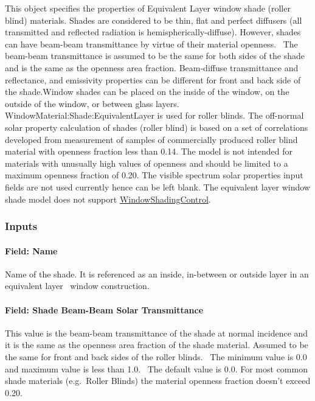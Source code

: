 This object specifies the properties of Equivalent Layer window shade (roller blind) materials. Shades are considered to be thin, flat and perfect diffusers (all transmitted and reflected radiation is hemispherically-diffuse). However, shades can have beam-beam transmittance by virtue of their material openness.~ The beam-beam transmittance is assumed to be the same for both sides of the shade and is the same as the openness area fraction. Beam-diffuse transmittance and reflectance, and emissivity properties can be different for front and back side of the shade.Window shades can be placed on the inside of the window, on the outside of the window, or between glass layers. WindowMaterial:Shade:EquivalentLayer is used for roller blinds. The off-normal solar property calculation of shades (roller blind) is based on a set of correlations developed from measurement of samples of commercially produced roller blind material with openness fraction less than 0.14. The model is not intended for materials with unusually high values of openness and should be limited to a maximum openness fraction of 0.20. The visible spectrum solar properties input fields are not used currently hence can be left blank. The equivalent layer window shade model does not support \hyperref[windowpropertyshadingcontrol]{WindowShadingControl}.

\subsubsection{Inputs}\label{inputs-26-002}

\paragraph{Field: Name}\label{field-name-20-003}

Name of the shade. It is referenced as an inside, in-between or outside layer in an equivalent layer~ window construction.

\paragraph{Field: Shade Beam-Beam Solar Transmittance}\label{field-shade-beam-beam-solar-transmittance}

This value is the beam-beam transmittance of the shade at normal incidence and it is the same as the openness area fraction of the shade material. Assumed to be the same for front and back sides of the roller blinds.~ The minimum value is 0.0 and maximum value is less than 1.0.~ The default value is 0.0. For most common shade materials (e.g.~Roller Blinds) the material openness fraction doesn't exceed 0.20.

